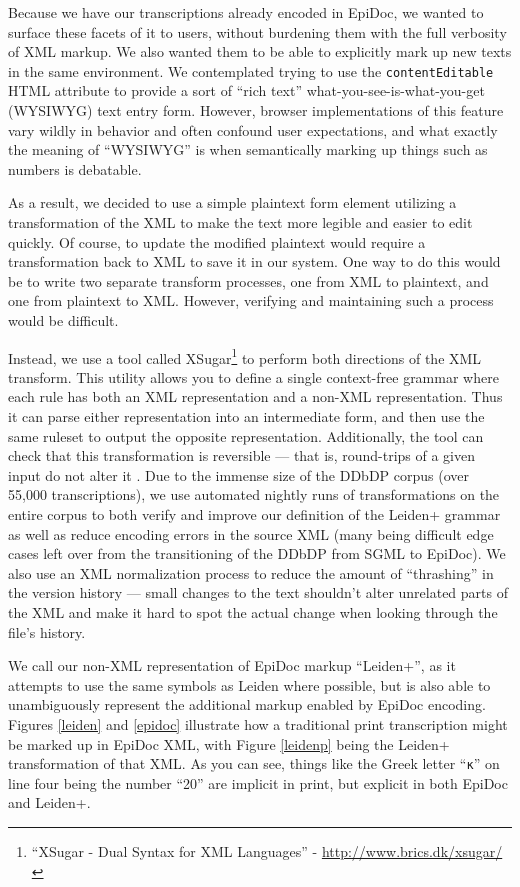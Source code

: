 \documentclass[]{article}
\begin{document}
Because we have our transcriptions already encoded in EpiDoc, we wanted to surface these facets of it to users, without burdening them with the full verbosity of XML markup. We also wanted them to be able to explicitly mark up new texts in the same environment. We contemplated trying to use the \texttt{contentEditable} HTML attribute to provide a sort of “rich text” what-you-see-is-what-you-get (WYSIWYG) text entry form. However, browser implementations of this feature vary wildly in behavior and often confound user expectations, and what exactly the meaning of “WYSIWYG” is when semantically marking up things such as numbers is debatable.

As a result, we decided to use a simple plaintext form element utilizing a transformation of the XML to make the text more legible and easier to edit quickly. Of course, to update the modified plaintext would require a transformation back to XML to save it in our system. One way to do this would be to write two separate transform processes, one from XML to plaintext, and one from plaintext to XML. However, verifying and maintaining such a process would be difficult.

Instead, we use a tool called XSugar\footnote{“XSugar - Dual Syntax for XML Languages” - \url{http://www.brics.dk/xsugar/}} to perform both directions of the XML transform. This utility allows you to define a single context-free grammar where each rule has both an XML representation and a non-XML representation. Thus it can parse either representation into an intermediate form, and then use the same ruleset to output the opposite representation. Additionally, the tool can check that this transformation is reversible — that is, round-trips of a given input do not alter it \citep{xsugar}. Due to the immense size of the DDbDP corpus (over 55,000 transcriptions), we use automated nightly runs of transformations on the entire corpus to both verify and improve our definition of the Leiden+ grammar as well as reduce encoding errors in the source XML (many being difficult edge cases left over from the transitioning of the DDbDP from SGML to EpiDoc). We also use an XML normalization process to reduce the amount of “thrashing” in the version history — small changes to the text shouldn't alter unrelated parts of the XML and make it hard to spot the actual change when looking through the file's history.

We call our non-XML representation of EpiDoc markup “Leiden+”, as it attempts to use the same symbols as Leiden where possible, but is also able to unambiguously represent the additional markup enabled by EpiDoc encoding. Figures \ref{leiden} and \ref{epidoc} illustrate how a traditional print transcription might be marked up in EpiDoc XML, with Figure \ref{leidenp} being the Leiden+ transformation of that XML. As you can see, things like the Greek letter “\texttt{κ}” on line four being the number “20” are implicit in print, but explicit in both EpiDoc and Leiden+.
\end{document}
